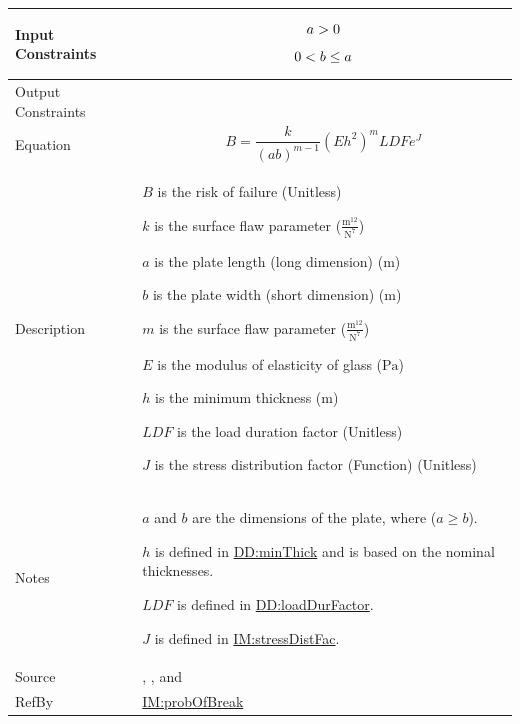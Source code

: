 \documentclass[12pt]{article}
\newcommand{\gt}{\ensuremath >}
\newcommand{\lt}{\ensuremath <}
\begin{document}
\begin{minipage}{\textwidth}
\begin{tabular}{>{\raggedright}p{}>{\raggedright\arraybackslash}p{}}
\\ \midrule
Input Constraints & \begin{displaymath}
                    a\gt{}0
                    \end{displaymath}
                    \begin{displaymath}
                    0\lt{}b\leq{}a
                    \end{displaymath}
\\ \midrule
Output Constraints & 
\\ \midrule
Equation & \begin{displaymath}
           B=\frac{k}{\left(a b\right)^{m-1}} \left(E h^{2}\right)^{m} \mathit{LDF} e^{J}
           \end{displaymath}
\\ \midrule
Description & \begin{symbDescription}
              \item{$B$ is the risk of failure (Unitless)}
              \item{$k$ is the surface flaw parameter ($\frac{\text{m}^{12}}{\text{N}^{7}}$)}
              \item{$a$ is the plate length (long dimension) (${\text{m}}$)}
              \item{$b$ is the plate width (short dimension) (${\text{m}}$)}
              \item{$m$ is the surface flaw parameter ($\frac{\text{m}^{12}}{\text{N}^{7}}$)}
              \item{$E$ is the modulus of elasticity of glass (${\text{Pa}}$)}
              \item{$h$ is the minimum thickness (${\text{m}}$)}
              \item{$\mathit{LDF}$ is the load duration factor (Unitless)}
              \item{$J$ is the stress distribution factor (Function) (Unitless)}
              \end{symbDescription}
\\ \midrule
Notes & $a$ and $b$ are the dimensions of the plate, where ($a\geq{}b$).
        
        $h$ is defined in \hyperref[DD:minThick]{DD:minThick} and is based on the nominal thicknesses.
        
        $\mathit{LDF}$ is defined in \hyperref[DD:loadDurFactor]{DD:loadDurFactor}.
        
        $J$ is defined in \hyperref[IM:stressDistFac]{IM:stressDistFac}.
        
\\ \midrule
Source & \cite{astm2009}, \cite[(Eqs. 4-5)]{beasonEtAl1998}, and \cite[(Eq. 14)]{campidelli}
         
\\ \midrule
RefBy & \hyperref[IM:probOfBreak]{IM:probOfBreak}
        
\\ \bottomrule
\end{tabular}
\end{minipage}
\end{document}
